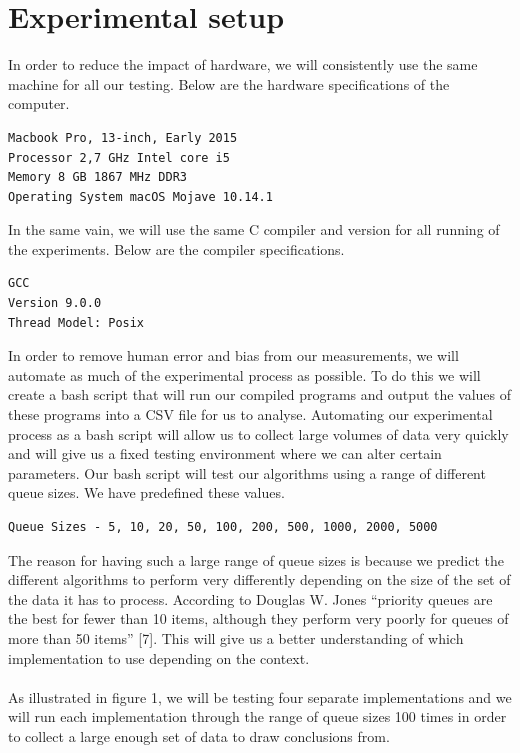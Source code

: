 \documentclass[12pt]{article}
\begin{document}
\section{Experimental setup}

In order to reduce the impact of hardware, we will consistently use the same machine for all our testing. Below are the hardware specifications of the computer.

\begin{verbatim}
Macbook Pro, 13-inch, Early 2015
Processor 2,7 GHz Intel core i5
Memory 8 GB 1867 MHz DDR3
Operating System macOS Mojave 10.14.1
\end{verbatim}

In the same vain, we will use the same C compiler and version for all running of the experiments. Below are the compiler specifications.

\begin{verbatim}
GCC
Version 9.0.0
Thread Model: Posix
\end{verbatim}

In order to remove human error and bias from our measurements, we will automate as much of the experimental process as possible. To do this we will create a bash script that will run our compiled programs and output the values of  these programs into a CSV file for us to analyse. Automating our experimental process as a bash script will allow us to collect large volumes of data very quickly and will give us a fixed testing environment where we can alter certain parameters. Our bash script will test our algorithms using a range of different queue sizes. We have predefined these values.

\begin{verbatim}
Queue Sizes - 5, 10, 20, 50, 100, 200, 500, 1000, 2000, 5000
\end{verbatim}

The reason for having such a large range of queue sizes is because we predict the different algorithms to perform very differently depending on the size of the set of the data it has to process. According to Douglas W. Jones “priority queues are the best for fewer than 10 items, although they perform very poorly for queues of more than 50 items” [7]. This will give us a better understanding of which implementation to use depending on the context.
\\
\\
As illustrated in figure 1, we will be testing four separate implementations and we will run each implementation through the range of queue sizes 100 times in order to collect a large enough set of data to draw conclusions from. 
\end{document}
